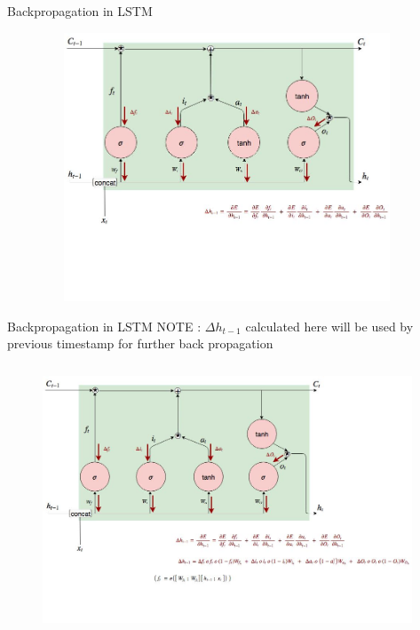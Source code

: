 \documentclass{beamer}
\begin{document}
\begin{frame}{Backpropagation in LSTM}
\begin{figure}
\includegraphics[width=11cm, height=8cm]{lstm_backpropagation_6.jpg}
\end{figure}
\end{frame}


\begin{frame}{Backpropagation in LSTM}
NOTE : $\Delta h_{t-1}$ calculated here will be used by previous timestamp for further back propagation 
\begin{figure}
\includegraphics[width=11cm, height=8cm]{lstm_backpropagation_7.jpg}
\end{figure}
\end{frame}

\end{document}
